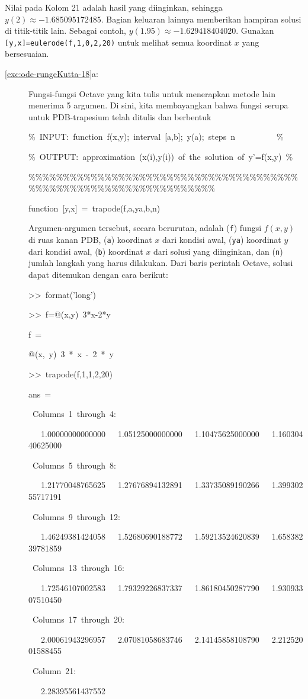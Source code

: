 Nilai pada Kolom 21 adalah hasil yang diinginkan, sehingga $y(2)\approx-1.685095172485$.
Bagian keluaran lainnya memberikan hampiran solusi di titik-titik
lain. Sebagai contoh, $y(1.95)\approx-1.629418404020$. Gunakan \texttt{{[}y,x{]}=eulerode(f,1,0,2,20)}
untuk melihat semua koordinat $x$ yang bersesuaian.
\begin{description}
\item [{\ref{exc:ode-rungeKutta-18}a:}] Fungsi-fungsi Octave yang kita
tulis untuk menerapkan metode lain menerima 5 argumen. Di sini, kita
membayangkan bahwa fungsi serupa untuk PDB-trapesium telah ditulis
dan berbentuk

\begin{lyxcode}
\%~INPUT:~function~f(x,y);~interval~{[}a,b{]};~y(a);~steps~n~~~~~~~~~~\%

\%~OUTPUT:~approximation~(x(i),y(i))~of~the~solution~of~y'=f(x,y)~\%

\%\%\%\%\%\%\%\%\%\%\%\%\%\%\%\%\%\%\%\%\%\%\%\%\%\%\%\%\%\%\%\%\%\%\%\%\%\%\%\%\%\%\%\%\%\%\%\%\%\%\%\%\%\%\%\%\%\%\%\%\%\%\%\%\%\%

function~{[}y,x{]}~=~trapode(f,a,ya,b,n)~
\end{lyxcode}
Argumen-argumen tersebut, secara berurutan, adalah (\texttt{f}) fungsi
$f(x,y)$ di ruas kanan PDB, (\texttt{a}) koordinat $x$ dari kondisi
awal, (\texttt{ya}) koordinat $y$ dari kondisi awal, (\texttt{b})
koordinat $x$ dari solusi yang diinginkan, dan (\texttt{n}) jumlah
langkah yang harus dilakukan. Dari baris perintah Octave, solusi dapat
ditemukan dengan cara berikut:
\begin{lyxcode}
>\textcompwordmark >~format('long')

>\textcompwordmark >~f=@(x,y)~3{*}x-2{*}y

f~=

@(x,~y)~3~{*}~x~-~2~{*}~y

>\textcompwordmark >~trapode(f,1,1,2,20)

ans~=

~Columns~1~through~4:

~~~1.00000000000000~~~1.05125000000000~~~1.10475625000000~~~1.16030440625000

~Columns~5~through~8:

~~~1.21770048765625~~~1.27676894132891~~~1.33735089190266~~~1.39930255717191

~Columns~9~through~12:

~~~1.46249381424058~~~1.52680690188772~~~1.59213524620839~~~1.65838239781859

~Columns~13~through~16:

~~~1.72546107002583~~~1.79329226837337~~~1.86180450287790~~~1.93093307510450

~Columns~17~through~20:

~~~2.00061943296957~~~2.07081058683746~~~2.14145858108790~~~2.21252001588455

~Column~21:

~~~2.28395561437552
\end{lyxcode}
\end{description}
